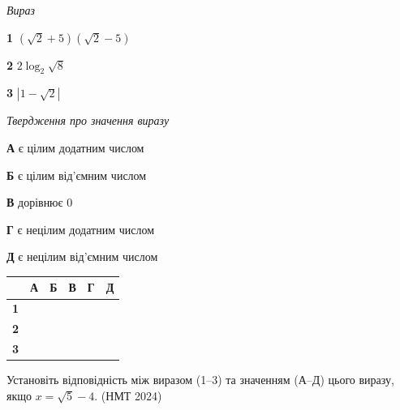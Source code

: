 \documentclass[14pt]{extarticle}
\newcommand{\matchTable}{
\begin{tabular}{|>{\centering\arraybackslash}p{0.3cm}|*{5}{>{\centering\arraybackslash}p{0.3cm}|}}
\hline
& \textbf{А} & \textbf{Б} & \textbf{В} & \textbf{Г} & \textbf{Д} \\
\hline
\textbf{1} & \rule{0pt}{0.3cm} & & & & \\
\hline
\textbf{2} & \rule{0pt}{0.3cm} & & & & \\
\hline
\textbf{3} & \rule{0pt}{0.3cm} & & & & \\
\hline
\end{tabular}
}
\newcommand{\task}[2]{\noindent\makebox[1.5em][l]{\textbf{#1.}}\parbox[t]{\dimexpr\textwidth-1.5em}{#2}}
\newcommand{\nmtyear}[1]{\hfill{\small\color{yearcolor}(НМТ #1)}}
\begin{document}
\vspace{0.3cm}
\begin{minipage}{0.35\textwidth}
\textit{Вираз}

\vspace{0.2cm}
\textbf{1} \quad $(\sqrt{2} + 5)(\sqrt{2} - 5)$

\vspace{0.2cm}
\textbf{2} \quad $2\log_2 \sqrt{8}$

\vspace{0.2cm}
\textbf{3} \quad $|1 - \sqrt{2}|$
\end{minipage}
\hfill
\begin{minipage}{0.4\textwidth}
\textit{Твердження про значення виразу}

\vspace{0.2cm}
\textbf{А} \quad є цілим додатним числом

\vspace{0.2cm}
\textbf{Б} \quad є цілим від'ємним числом

\vspace{0.2cm}
\textbf{В} \quad дорівнює 0

\vspace{0.2cm}
\textbf{Г} \quad є нецілим додатним числом

\vspace{0.2cm}
\textbf{Д} \quad є нецілим від'ємним числом
\end{minipage}
\hfill
\begin{minipage}{0.15\textwidth}
\matchTable
\end{minipage}

\vspace{0.7cm}

\task{34}{Установіть відповідність між виразом (1--3) та значенням (А--Д) цього виразу, якщо $x = \sqrt{5} - 4$. \nmtyear{2024}}
\end{document}
